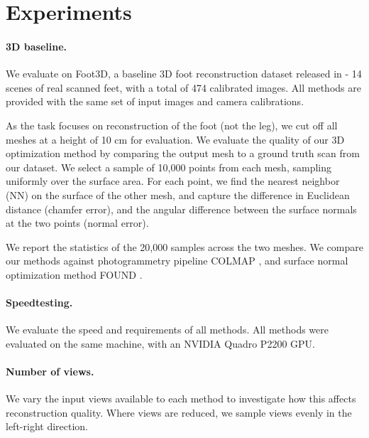 \section{Experiments}

\paragraph{3D baseline. } We evaluate on Foot3D, a baseline 3D foot reconstruction dataset released in \cite{boyne2024found} - 14 scenes of real scanned feet, with a total of 474 calibrated images. All methods are provided with the same set of input images and camera calibrations.

As the task focuses on reconstruction of the foot (not the leg), we cut off all meshes at a height of 10 cm for evaluation.
We evaluate the quality of our 3D optimization method by comparing the output mesh to a ground truth scan from our dataset. We select a sample of 10,000 points from each mesh, sampling uniformly over the surface area. For each point, we find the nearest neighbor (NN) on the surface of the other mesh, and capture the difference in Euclidean distance (chamfer error), and the angular difference between the surface normals at the two points (normal error).

We report the statistics of the 20,000 samples across the two meshes. We compare our methods against photogrammetry pipeline COLMAP \cite{schonberger2016structure, schonberger2016pixelwise}, and surface normal optimization method FOUND \cite{boyne2024found}.


\paragraph{Speedtesting.} We evaluate the speed and requirements of all methods. All methods were evaluated on the same machine, with an NVIDIA Quadro P2200 GPU.

\paragraph{Number of views.} We vary the input views available to each method to investigate how this affects reconstruction quality. Where views are reduced, we sample views evenly in the left-right direction.